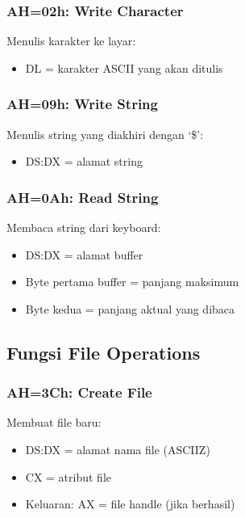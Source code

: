 \documentclass[../main.tex]{subfiles}
\begin{document}
            \subsubsection{AH=02h: Write Character}
                Menulis karakter ke layar:
                \begin{itemize}
                    \item DL = karakter ASCII yang akan ditulis
                \end{itemize}

            \subsubsection{AH=09h: Write String}
                Menulis string yang diakhiri dengan `\$':
                \begin{itemize}
                    \item DS:DX = alamat string
                \end{itemize}

            \subsubsection{AH=0Ah: Read String}
                Membaca string dari keyboard:
                \begin{itemize}
                    \item DS:DX = alamat buffer
                    \item Byte pertama buffer = panjang maksimum
                    \item Byte kedua = panjang aktual yang dibaca
                \end{itemize}

        \subsection{Fungsi File Operations}
            \subsubsection{AH=3Ch: Create File}
                Membuat file baru:
                \begin{itemize}
                    \item DS:DX = alamat nama file (ASCIIZ)
                    \item CX = atribut file
                    \item Keluaran: AX = file handle (jika berhasil)
                \end{itemize}
\end{document}
